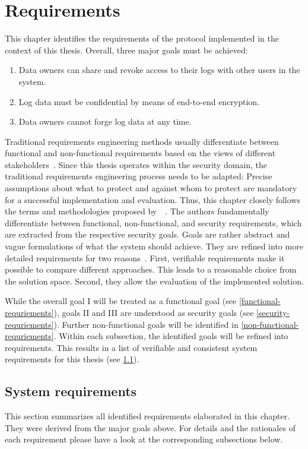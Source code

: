 \documentclass[../main.tex]{subfiles}
\begin{document}
\chapter{Requirements}
\label{chap:requirements}

This chapter identifies the requirements of the protocol implemented in the context of this thesis.
Overall, three major goals must be achieved:

\begin{enumerate}[label=\Roman*.]
    \item Data owners can share and revoke access to their logs with other users in the system.
	\item Log data must be confidential by means of end-to-end encryption.
    \item Data owners cannot forge log data at any time.
\end{enumerate}

Traditional requirements engineering methods usually differentiate between functional and non-functional requirements based on the views of different stakeholders~\cite{Rehman2013}.
Since this thesis operates within the security domain, the traditional requirements engineering process needs to be adapted: 
Precise assumptions about what to protect and against whom to protect are mandatory for a successful implementation and evaluation.
Thus, this chapter closely follows the terms and methodologies proposed by~\citeauthor{Fabian2010}~\cite{Fabian2010}.
The authors fundamentally differentiate between functional, non-functional, and security requirements, which are extracted from the respective security goals.
Goals are rather abstract and vague formulations of what the system should achieve. 
They are refined into more detailed requirements for two reasons~\cite{Fabian2010}.
First, verifiable requirements make it possible to compare different approaches.
This leads to a reasonable choice from the solution space.
Second, they allow the evaluation of the implemented solution.

While the overall goal I will be treated as a functional goal (see \cref{functional-requriements}), goals II and III are understood as security goals (see \cref{security-requriements}).
Further non-functional goals will be identified in \cref{non-functional-requriements}.
Within each subsection, the identified goals will be refined into requirements.
This results in a list of verifiable and consistent system requirements for this thesis (see \cref{system-requriements}).


\section{System requirements}\label{system-requriements}
This section summarizes all identified requirements elaborated in this chapter.
They were derived from the major goals above.
For details and the rationales of each requirement please have a look at the corresponding subsections below.
\end{document}
